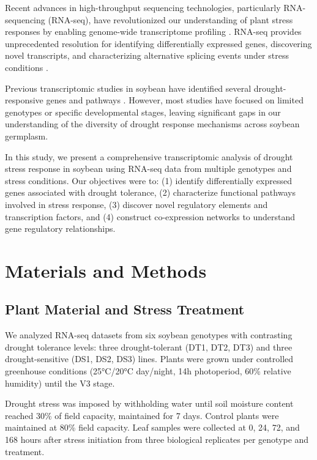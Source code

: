\documentclass[11pt,a4paper]{article}
\begin{document}
Recent advances in high-throughput sequencing technologies, particularly RNA-sequencing (RNA-seq), have revolutionized our understanding of plant stress responses by enabling genome-wide transcriptome profiling \citep{Wang2009}. RNA-seq provides unprecedented resolution for identifying differentially expressed genes, discovering novel transcripts, and characterizing alternative splicing events under stress conditions \citep{Marquez2012}.

Previous transcriptomic studies in soybean have identified several drought-responsive genes and pathways \citep{Le2012,Prince2015,Belamkar2014}. However, most studies have focused on limited genotypes or specific developmental stages, leaving significant gaps in our understanding of the diversity of drought response mechanisms across soybean germplasm.

In this study, we present a comprehensive transcriptomic analysis of drought stress response in soybean using RNA-seq data from multiple genotypes and stress conditions. Our objectives were to: (1) identify differentially expressed genes associated with drought tolerance, (2) characterize functional pathways involved in stress response, (3) discover novel regulatory elements and transcription factors, and (4) construct co-expression networks to understand gene regulatory relationships.

\section{Materials and Methods}

\subsection{Plant Material and Stress Treatment}

We analyzed RNA-seq datasets from six soybean genotypes with contrasting drought tolerance levels: three drought-tolerant (DT1, DT2, DT3) and three drought-sensitive (DS1, DS2, DS3) lines. Plants were grown under controlled greenhouse conditions (25°C/20°C day/night, 14h photoperiod, 60\% relative humidity) until the V3 stage.

Drought stress was imposed by withholding water until soil moisture content reached 30\% of field capacity, maintained for 7 days. Control plants were maintained at 80\% field capacity. Leaf samples were collected at 0, 24, 72, and 168 hours after stress initiation from three biological replicates per genotype and treatment.
\end{document}
